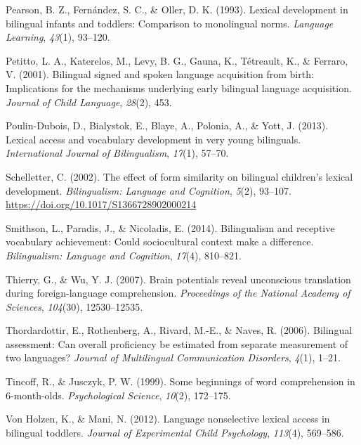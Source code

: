 \documentclass[
  english,
  man,man,floatsintext]{apa6}
\newlength{\cslhangindent}
\newenvironment{CSLReferences}[2] %
 {%
  \setlength{\parindent}{0pt}
  \ifodd #1 \everypar{\setlength{\hangindent}{\cslhangindent}}\ignorespaces\fi
  \ifnum #2 > 0
  \setlength{\parskip}{#2\baselineskip}
  \fi
 }%
 {}
\begin{document}
\begin{CSLReferences}{1}{0}
\leavevmode{}%
Pearson, B. Z., Fernández, S. C., \& Oller, D. K. (1993). Lexical development in bilingual infants and toddlers: Comparison to monolingual norms. \emph{Language Learning}, \emph{43}(1), 93--120.

\leavevmode{}%
Petitto, L. A., Katerelos, M., Levy, B. G., Gauna, K., Tétreault, K., \& Ferraro, V. (2001). Bilingual signed and spoken language acquisition from birth: Implications for the mechanisms underlying early bilingual language acquisition. \emph{Journal of Child Language}, \emph{28}(2), 453.

\leavevmode{}%
Poulin-Dubois, D., Bialystok, E., Blaye, A., Polonia, A., \& Yott, J. (2013). Lexical access and vocabulary development in very young bilinguals. \emph{International Journal of Bilingualism}, \emph{17}(1), 57--70.

\leavevmode{}%
Schelletter, C. (2002). The effect of form similarity on bilingual children's lexical development. \emph{Bilingualism: Language and Cognition}, \emph{5}(2), 93--107. \url{https://doi.org/10.1017/S1366728902000214}

\leavevmode{}%
Smithson, L., Paradis, J., \& Nicoladis, E. (2014). Bilingualism and receptive vocabulary achievement: Could sociocultural context make a difference. \emph{Bilingualism: Language and Cognition}, \emph{17}(4), 810--821.

\leavevmode{}%
Thierry, G., \& Wu, Y. J. (2007). Brain potentials reveal unconscious translation during foreign-language comprehension. \emph{Proceedings of the National Academy of Sciences}, \emph{104}(30), 12530--12535.

\leavevmode{}%
Thordardottir, E., Rothenberg, A., Rivard, M.-E., \& Naves, R. (2006). Bilingual assessment: Can overall proficiency be estimated from separate measurement of two languages? \emph{Journal of Multilingual Communication Disorders}, \emph{4}(1), 1--21.

\leavevmode{}%
Tincoff, R., \& Jusczyk, P. W. (1999). Some beginnings of word comprehension in 6-month-olds. \emph{Psychological Science}, \emph{10}(2), 172--175.

\leavevmode{}%
Von Holzen, K., \& Mani, N. (2012). Language nonselective lexical access in bilingual toddlers. \emph{Journal of Experimental Child Psychology}, \emph{113}(4), 569--586.

\end{CSLReferences}

\endgroup
\end{document}
